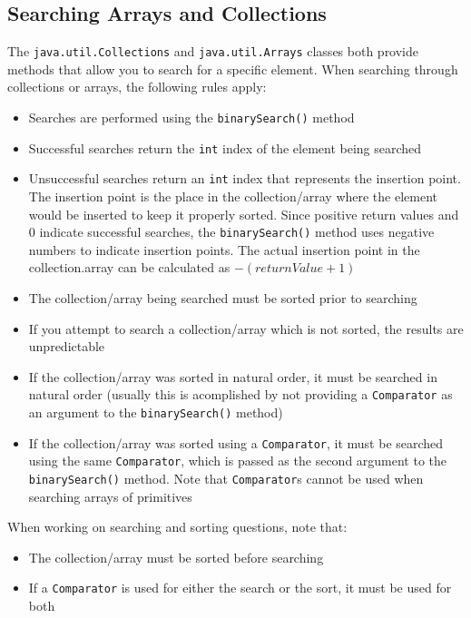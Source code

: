 \subsection{Searching Arrays and Collections}
The \verb#java.util.Collections# and \verb#java.util.Arrays# classes both 
provide methods that allow you to search for a specific element. When searching 
through collections or arrays, the following rules apply:
\begin{itemize}
    \item Searches are performed using the \verb#binarySearch()# method
    \item Successful searches return the \verb#int# index of the element being 
    searched
    \item Unsuccessful searches return an \verb#int# index that represents the 
    insertion point. The insertion point is the place in the collection/array 
    where the element would be inserted to keep it properly sorted. Since 
    positive return values and 0 indicate successful searches, the 
    \verb#binarySearch()# method uses negative numbers to indicate insertion 
    points. The actual insertion point in the collection.array can be 
    calculated as $-(returnValue + 1)$
    \item The collection/array being searched must be sorted prior to searching
    \item If you attempt to search a collection/array which is not sorted, the 
    results are unpredictable
    \item If the collection/array was sorted in natural order, it must be 
    searched in natural order (usually this is acomplished by not providing a 
    \verb#Comparator# as an argument to the \verb#binarySearch()# method)
    \item If the collection/array was sorted using a \verb#Comparator#, it must 
    be searched using the same \verb#Comparator#, which is passed as the second 
    argument to the \verb#binarySearch()# method. Note that \verb#Comparator#s 
    cannot be used when searching arrays of primitives
\end{itemize}
When working on searching and sorting questions, note that:
\begin{itemize}
    \item The collection/array must be sorted before searching
    \item If a \verb#Comparator# is used for either the search or the sort, it 
    must be used for both
\end{itemize}

